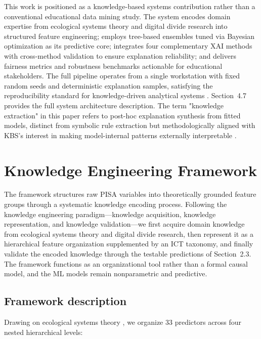 \documentclass[review,12pt]{elsarticle}
\begin{document}
This work is positioned as a knowledge-based systems contribution rather than a conventional educational data mining study. The system encodes domain expertise from ecological systems theory and digital divide research into structured feature engineering; employs tree-based ensembles tuned via Bayesian optimization as its predictive core; integrates four complementary XAI methods with cross-method validation to ensure explanation reliability; and delivers fairness metrics and robustness benchmarks actionable for educational stakeholders. The full pipeline operates from a single workstation with fixed random seeds and deterministic explanation samples, satisfying the reproducibility standard for knowledge-driven analytical systems \citep{Breiman_2001,Romero_Ventura_2020}. Section~4.7 provides the full system architecture description. The term "knowledge extraction" in this paper refers to post-hoc explanation synthesis from fitted models, distinct from symbolic rule extraction but methodologically aligned with KBS's interest in making model-internal patterns externally interpretable \citep{CaroMartinez2024iSee}.

\section{Knowledge Engineering Framework}

The framework structures raw PISA variables into theoretically grounded feature groups through a systematic knowledge encoding process. Following the knowledge engineering paradigm---knowledge acquisition, knowledge representation, and knowledge validation---we first acquire domain knowledge from ecological systems theory and digital divide research, then represent it as a hierarchical feature organization supplemented by an ICT taxonomy, and finally validate the encoded knowledge through the testable predictions of Section~2.3. The framework functions as an organizational tool rather than a formal causal model, and the ML models remain nonparametric and predictive.

\subsection{Framework description}

Drawing on ecological systems theory \citep{Bronfenbrenner_1979,Bronfenbrenner_1994}, we organize 33 predictors across four nested hierarchical levels:
\end{document}
